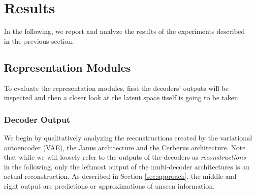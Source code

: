 \section{Results}
\label{sec:results}

In the following, we report and analyze the results of the experiments described in the previous section. 

\subsection{Representation Modules}
To evaluate the representation modules, first the decoders' outputs will be inspected and then a closer look at the latent space itself is going to be taken.

\subsubsection{Decoder Output}
We begin by qualitatively analyzing the reconstructions created by the variational autoencoder (VAE), the Janus architecture and the Cerberus architecture. Note that while we will loosely refer to the outputs of the decoders as \textit{reconstructions} in the following, only the leftmost output of the multi-decoder architectures is an actual reconstruction. As described in Section \ref{sec:approach}, the middle and right output are predictions or approximations of unseen information.

